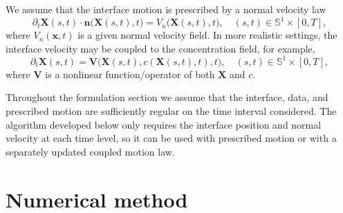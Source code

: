 \documentclass[11pt,reqno]{amsart}
\theoremstyle{plain}
\theoremstyle{definition}
\numberwithin{equation}{section}
\newcommand{\p}{\partial}
\newcommand{\bm}[1]{\boldsymbol{#1}}
\begin{document}
We assume that the interface motion is prescribed by a normal velocity law
\begin{equation}
  \p_t \bm X(s,t) \cdot \bm n\big(\bm X(s,t),t\big) = V_n\big(\bm X(s,t),t\big), \quad (s,t)\in \mathbb S^1\times [0,T],
\end{equation}
where $V_n(\bm x,t)$ is a given normal velocity field. In more realistic settings, the interface velocity may be coupled to the concentration field, for example,
\begin{equation}
  \p_t \bm X(s,t) = \bm V\big(\bm X(s,t),c(\bm X(s,t),t),t\big), \quad (s,t)\in \mathbb S^1\times [0,T],
\end{equation}
where $\bm V$ is a nonlinear function/operator of both $\bm X$ and $c$.

Throughout the formulation section we assume that the interface, data, and
prescribed motion are sufficiently regular on the time interval considered.
The algorithm developed below only requires the interface position and normal
velocity at each time level, so it can be used with prescribed motion or with a
separately updated coupled motion law.

\section{Numerical method}\label{sec:method}
\end{document}
